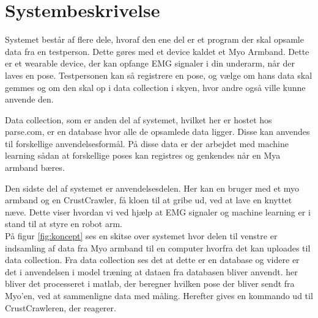 \thispagestyle{fancy}
\chapter{Systembeskrivelse}
\label{chp:systembeskrivelse}

Systemet består af flere dele, hvoraf den ene del er et program der skal opsamle data fra en testperson. Dette gøres med et device kaldet et Myo Armband. Dette er et wearable device, der kan opfange EMG signaler i din underarm, når der laves en pose. Testpersonen kan så registrere en pose, og vælge om hans data skal gemmes og om den skal op i data collection i skyen, hvor andre også ville kunne anvende den.

Data collection, som er anden del af systemet, hvilket her er hostet hos parse.com, er en database hvor alle de opsamlede data ligger. Disse kan anvendes til forskellige anvendelsesformål. På disse data er der arbejdet med machine learning sådan at forskellige poses kan registres og genkendes  når en Mya armband bæres.

Den sidste del af systemet er anvendelsesdelen. Her kan en bruger med et myo armband og en CrustCrawler, få kloen til at gribe ud, ved at lave en knyttet næve. Dette viser hvordan vi ved hjælp at EMG signaler og machine learning er i stand til at styre en robot arm.\\
På figur \ref{fig:koncept} ses en skitse over systemet hvor delen til venstre er indsamling af data fra Myo armband til en computer hvorfra det kan uploades til data collection. Fra data collection ses det at dette er en database og videre er det i anvendelsen i model træning at dataen fra databasen bliver anvendt. her bliver det processeret i matlab, der beregner hvilken pose der bliver sendt fra Myo'en, ved at sammenligne data med måling. Herefter gives en kommando ud til CrustCrawleren, der reagerer.

